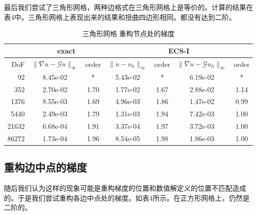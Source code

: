 \documentclass[12pt,a4paper]{article}
\theoremstyle{plain}
\begin{document}
最后我们尝试了三角形网格，两种边格式在三角形网格上是等价的。计算的结果在表4中。三角形网格上表现出来的结果和扭曲四边形相同。都没有达到二阶。

\begin{table}[h]
\centering
\scriptsize
\begin{tabular}{r|cc|cc|cc}
\hline
& \multicolumn{2}{c|}{exact} & \multicolumn{4}{c}{ECS-I} \\
\hline
DoF & $\|\nabla u - \mathcal{G} u\|_\infty$ & order & $\|u - u_h\|_\infty$ & order & $\|\nabla u - \mathcal{G} u_h\|_\infty$ & order \\
\hline
92 & 8.45e-02 & * & 5.43e-02 & * & 6.19e-02 & * \\
352 & 2.70e-02 & 1.70 & 1.77e-02 & 1.67 & 2.88e-02 & 1.14 \\
1376 & 8.55e-03 & 1.69 & 4.96e-03 & 1.86 & 1.47e-02 & 0.99 \\
5440 & 2.49e-03 & 1.79 & 1.31e-03 & 1.94 & 7.42e-03 & 1.00 \\
21632 & 6.68e-04 & 1.91 & 3.37e-04 & 1.97 & 3.72e-03 & 1.00 \\
86272 & 1.73e-04 & 1.96 & 8.54e-05 & 1.98 & 1.86e-03 & 1.00 \\
\hline
\end{tabular}
\caption{三角形网格 重构节点处的梯度}
\end{table}

\newpage
\subsection*{重构边中点的梯度}

随后我们认为这样的现象可能是重构梯度的位置和数值解定义的位置不匹配造成的。于是我们尝试重构各边中点处的梯度。如表4所示。在正方形网格上，仍然是二阶的。
\end{document}
